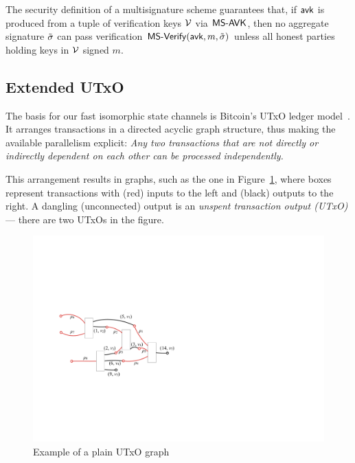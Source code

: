 The security definition of a multisignature scheme guarantees that, if $\mathsf{avk}$ is produced from a tuple of verification keys $\mathcal V$ via $\mathsf{MS\textsf{-}{}AVK}$, then no aggregate signature $\tilde \sigma$ can pass verification $\mathsf{MS\textsf{-}{}Verify}(\mathsf{avk},m,\tilde \sigma)$ unless all honest parties holding keys in $\mathcal V$ signed $m$.

\subsection{Extended UTxO}
The basis for our fast isomorphic state channels is Bitcoin's UTxO ledger model~\cite{formal-model-of-bitcoin-transactions,Zahnentferner18-UTxO}. It arranges transactions in a directed acyclic graph structure, thus making the available parallelism explicit: \emph{Any two transactions that are not directly or indirectly dependent on each other can be processed independently.}

This arrangement results in graphs, such as the one in Figure~\ref{fig:utxo-graph},
where boxes represent transactions with (red) inputs to the left and (black) outputs to the
right. A dangling (unconnected) output is an \emph{unspent transaction output (UTxO)} --- there are two UTxOs in the figure.

\begin{figure}[h]
  \centering
 \includegraphics[width=\textwidth/2]{figures/utxo-graph.pdf}
 \caption{Example of a plain UTxO graph}
  \label{fig:utxo-graph}
\end{figure}


